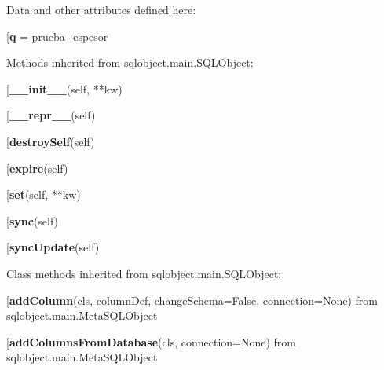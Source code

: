 Data and other attributes defined here:\\
\begin{description}\item[{\bf q} = prueba\_espesor\end{description}


Methods inherited from sqlobject.main.SQLObject:\\
\begin{description}\item[{\bf \_\_init\_\_}(self, **kw)\end{description}

\begin{description}\item[{\bf \_\_repr\_\_}(self)\end{description}

\begin{description}\item[{\bf destroySelf}(self)\end{description}

\begin{description}\item[{\bf expire}(self)\end{description}

\begin{description}\item[{\bf set}(self, **kw)\end{description}

\begin{description}\item[{\bf sync}(self)\end{description}

\begin{description}\item[{\bf syncUpdate}(self)\end{description}


Class methods inherited from sqlobject.main.SQLObject:\\
\begin{description}\item[{\bf addColumn}(cls, columnDef, changeSchema=False, connection=None) from sqlobject.main.MetaSQLObject\end{description}

\begin{description}\item[{\bf addColumnsFromDatabase}(cls, connection=None) from sqlobject.main.MetaSQLObject\end{description}

